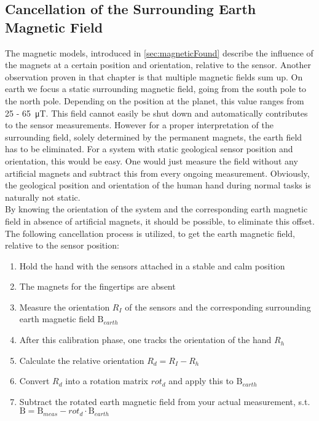 \subsection{Cancellation of the Surrounding Earth Magnetic Field} \label{subsec:earthEli}

The magnetic models, introduced in \ref{sec:magneticFound} describe the influence of the magnets at a certain position and orientation, relative to the sensor. Another observation proven in that chapter is that multiple magnetic fields sum up. On earth we focus a static surrounding magnetic field, going from the south pole to the north pole. Depending on the position at the planet, this value ranges from 25 - \SI{65}{\micro \tesla}. This field cannot easily be shut down and automatically contributes to the sensor measurements. However for a proper interpretation of the surrounding field, solely determined by the permanent magnets, the earth field has to be eliminated. For a system with static geological sensor position and orientation, this would be easy. One would just measure the field without any artificial magnets and subtract this from every ongoing measurement. Obviously, the geological position and orientation of the human hand during normal tasks is naturally not static.\\
By knowing the orientation of the system and the corresponding earth magnetic field in absence of artificial magnets, it should be possible, to eliminate this offset. The following cancellation process is utilized, to get the earth magnetic field, relative to the sensor position:\\
\begin{enumerate}
\item Hold the hand with the sensors attached in a stable and calm position
\item The magnets for the fingertips are absent
\item Measure the orientation $ R_{I} $ of the sensors and the corresponding surrounding earth magnetic field $ \mathrm{B}_{earth} $
\item After this calibration phase, one tracks the orientation of the hand $ R_{h} $
\item Calculate the relative orientation $ R_{d} = R_{I} - R_{h} $
\item Convert $ R_{d} $ into a rotation matrix $ rot_{d} $ and apply this to $ \mathrm{B}_{earth} $
\item Subtract the rotated earth magnetic field from your actual measurement, s.t. \\ $ \mathrm{B} = \mathrm{B}_{meas} - rot_{d} \cdot \mathrm{B}_{earth} $
\end{enumerate}
